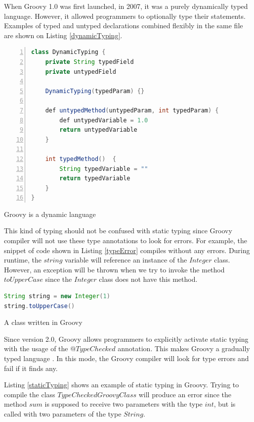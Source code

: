 \documentclass[preprint]{sigplanconf}
\begin{document}
When Groovy 1.0 was first launched, in 2007, it was a purely dynamically typed language.
However, it allowed programmers to optionally type their statements.
Examples of typed and untyped declarations combined flexibly in the same file are shown on Listing \ref{dynamicTyping}.


\begin{Listing}[ht]
\begin{lstlisting}[language=Java,tabsize=2,breaklines=true,numbers=left]
class DynamicTyping {
	private String typedField
	private untypedField

	DynamicTyping(typedParam) {}

	def untypedMethod(untypedParam, int typedParam) {
		def untypedVariable = 1.0
		return untypedVariable
	}

	int typedMethod()  {
		String typedVariable = ""
		return typedVariable
	}
}
\end{lstlisting}
\caption{Groovy is a dynamic language}
\label{dynamicTyping}
\end{Listing}

This kind of typing should not be confused with static typing since Groovy compiler will not use these type annotations to look for errors.
For example, the snippet of code shown in Listing \ref{typeError} compiles without any errors.
During runtime, the $string$ variable will reference an instance of the $Integer$ class.
However, an exception will be thrown when we try to invoke the method $toUpperCase$ since the $Integer$ class does not have this method.

\begin{Listing}[ht]
\begin{lstlisting}[language=Java,tabsize=2,breaklines=true]
String string = new Integer(1)
string.toUpperCase()
\end{lstlisting}
\caption{A class written in Groovy}
\label{typeError}
\end{Listing}

Since version 2.0, Groovy allows programmers to explicitly activate static typing with the usage of the $@TypeChecked$ annotation.
This makes Groovy a gradually typed language \cite{gray05,gray08,gray11,siek07,takikawa12}.
In this mode, the Groovy compiler will look for type errors and fail if it finds any.

Listing \ref{staticTyping} shows an example of static typing in Groovy.
Trying to compile the class $TypeCheckedGroovyClass$ will produce an error since the method $sum$ is supposed to receive two parameters with the type $int$, but is called with two parameters of the type $String$.
\end{document}
